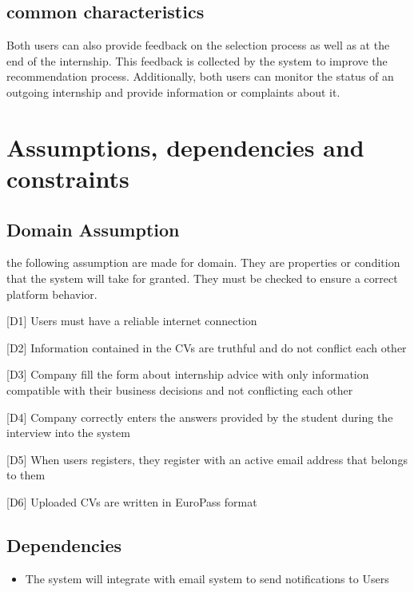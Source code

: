 		\subsection{common characteristics}
			Both users can also provide feedback on the selection process as well as at the end of the internship. This feedback is collected by the system to improve the recommendation process. Additionally, both users can monitor the status of an outgoing internship and provide information or complaints about it.
		
	\section{Assumptions, dependencies and constraints}
		\subsection{Domain Assumption}
			the following assumption are made for domain. They are properties or condition that the system will take for granted. They must be checked to ensure a correct platform behavior.
			
			[D1] Users must have a reliable internet connection
			
			[D2] Information contained in the CVs are truthful and do not conflict each other
			
			[D3] Company fill the form about internship advice with only information compatible with their business decisions and not conflicting each other
			
			[D4] Company correctly enters the answers provided by the student during the interview into the system
			
			[D5] When users registers, they register with an active email address that belongs to them
			
			[D6] Uploaded CVs are written in EuroPass format
		\subsection{Dependencies}
			\begin{itemize}
				\item The system will integrate with email system to send notifications to Users
			\end{itemize}
		
